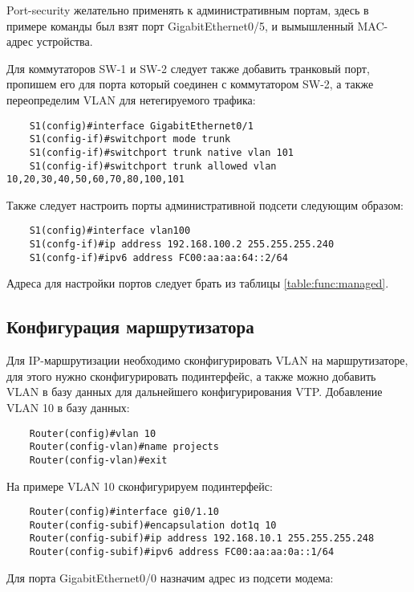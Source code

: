 Port-security желательно применять к административным портам, здесь в примере команды был взят порт GigabitEthernet0/5,
и вымышленный MAC-адрес устройства. 

Для коммутаторов SW-1 и SW-2 следует также добавить транковый порт, пропишем его для порта который соединен с коммутатором SW-2,
а также переопределим VLAN для нетегируемого трафика:

\begin{lstlisting}
    S1(config)#interface GigabitEthernet0/1
    S1(config-if)#switchport mode trunk
    S1(config-if)#switchport trunk native vlan 101
    S1(config-if)#switchport trunk allowed vlan 10,20,30,40,50,60,70,80,100,101
\end{lstlisting}

Также следует настроить порты административной подсети следующим образом:

\begin{lstlisting}
    S1(config)#interface vlan100
    S1(confg-if)#ip address 192.168.100.2 255.255.255.240
    S1(confg-if)#ipv6 address FC00:aa:aa:64::2/64
\end{lstlisting}

Адреса для настройки портов следует брать из таблицы \ref{table:func:managed}.

\subsection{Конфигурация маршрутизатора}

Для IP-маршрутизации необходимо сконфигурировать VLAN на маршрутизаторе, для этого нужно сконфигурировать
подинтерфейс, а также можно добавить VLAN в базу данных для дальнейшего конфигурирования VTP.
Добавление VLAN 10 в базу данных:
\begin{lstlisting}
    Router(config)#vlan 10
    Router(config-vlan)#name projects
    Router(config-vlan)#exit
\end{lstlisting}

На примере VLAN 10 сконфигурируем подинтерфейс:

\begin{lstlisting}
    Router(config)#interface gi0/1.10
    Router(config-subif)#encapsulation dot1q 10
    Router(config-subif)#ip address 192.168.10.1 255.255.255.248
    Router(config-subif)#ipv6 address FC00:aa:aa:0a::1/64
\end{lstlisting}

Для порта GigabitEthernet0/0 назначим адрес из подсети модема:

